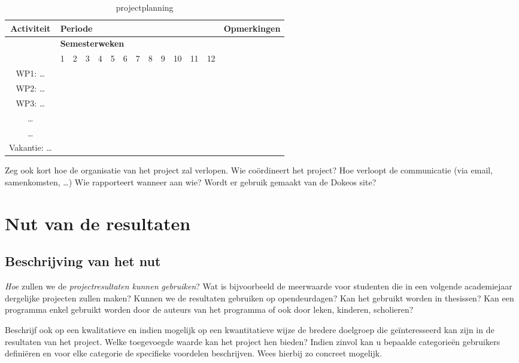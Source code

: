 \documentclass[]{book}
\begin{document}
\begin{table}[h]
	\centering
		\begin{tabular}{|*{14}{c|}}
		\hline
		\textbf{Activiteit} & \multicolumn{12}{l|}{\textbf{Periode}} & \textbf{Opmerkingen} \\
		\hline
							 & \multicolumn{12}{l|}{\textbf{Semesterweken}} &   \\
		\hline 
		  & 1	& 2	& 3	& 4	& 5	& 6	& 7	& 8	& 9	& 10 & 11	& 12 & \\
		\hline 
		WP1: \ldots & & & & & & & & & & & & & \\
		\hline 
		WP2: \ldots & & & & & & & & & & & & & \\
		\hline 
		WP3: \ldots & & & & & & & & & & & & & \\
		\hline 
		 \ldots & & & & & & & & & & & & & \\
		\hline 
		 \ldots & & & & & & & & & & & & & \\
		\hline 
		Vakantie: \ldots & & & & & & & & & & & & & \\
		\hline
		\end{tabular}
	\caption{projectplanning}
	\label{tab:projectplanning}
\end{table}
																							

Zeg ook kort hoe de organisatie van het project zal verlopen. Wie co\"ordineert het project? Hoe verloopt de communicatie (via email, samenkomsten, \ldots) Wie rapporteert wanneer aan wie? Wordt er gebruik gemaakt van de Dokeos site?


\section{Nut van de resultaten}\label{sec:Nut}

\subsection{Beschrijving van het nut}\label{sec:BeschrijvingNut}

\emph{Hoe} zullen we de \emph{projectresultaten kunnen gebruiken}? Wat is bijvoorbeeld de meerwaarde voor studenten die in een volgende academiejaar dergelijke projecten zullen maken? Kunnen we de resultaten gebruiken op opendeurdagen? Kan het gebruikt worden in thesissen? Kan een programma enkel gebruikt worden door de auteurs van het programma of ook door leken, kinderen, scholieren?

Beschrijf  ook op een kwalitatieve en indien mogelijk op een kwantitatieve wijze de bredere doelgroep die ge\"interesseerd kan zijn in de resultaten van het project. Welke toegevoegde waarde kan het project hen bieden?  Indien zinvol kan u bepaalde categorie\"en gebruikers defini\"eren en voor elke categorie de specifieke voordelen beschrijven. Wees hierbij zo concreet mogelijk. 
\end{document}
